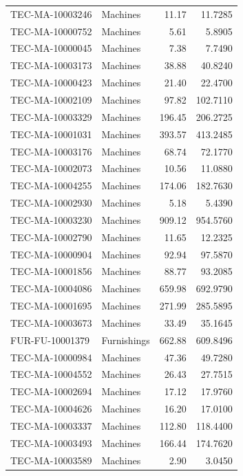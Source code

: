 \begin{longtable}{llrr}
TEC-MA-10003246 & Machines & 11.17 & 11.7285\\
TEC-MA-10000752 & Machines & 5.61 & 5.8905\\
TEC-MA-10000045 & Machines & 7.38 & 7.7490\\
TEC-MA-10003173 & Machines & 38.88 & 40.8240\\
TEC-MA-10000423 & Machines & 21.40 & 22.4700\\
TEC-MA-10002109 & Machines & 97.82 & 102.7110\\
TEC-MA-10003329 & Machines & 196.45 & 206.2725\\
TEC-MA-10001031 & Machines & 393.57 & 413.2485\\
TEC-MA-10003176 & Machines & 68.74 & 72.1770\\
TEC-MA-10002073 & Machines & 10.56 & 11.0880\\
TEC-MA-10004255 & Machines & 174.06 & 182.7630\\
TEC-MA-10002930 & Machines & 5.18 & 5.4390\\
TEC-MA-10003230 & Machines & 909.12 & 954.5760\\
TEC-MA-10002790 & Machines & 11.65 & 12.2325\\
TEC-MA-10000904 & Machines & 92.94 & 97.5870\\
TEC-MA-10001856 & Machines & 88.77 & 93.2085\\
TEC-MA-10004086 & Machines & 659.98 & 692.9790\\
TEC-MA-10001695 & Machines & 271.99 & 285.5895\\
TEC-MA-10003673 & Machines & 33.49 & 35.1645\\
FUR-FU-10001379 & Furnishings & 662.88 & 609.8496\\
TEC-MA-10000984 & Machines & 47.36 & 49.7280\\
TEC-MA-10004552 & Machines & 26.43 & 27.7515\\
TEC-MA-10002694 & Machines & 17.12 & 17.9760\\
TEC-MA-10004626 & Machines & 16.20 & 17.0100\\
TEC-MA-10003337 & Machines & 112.80 & 118.4400\\
TEC-MA-10003493 & Machines & 166.44 & 174.7620\\
TEC-MA-10003589 & Machines & 2.90 & 3.0450\\
\end{longtable}
\endgroup
